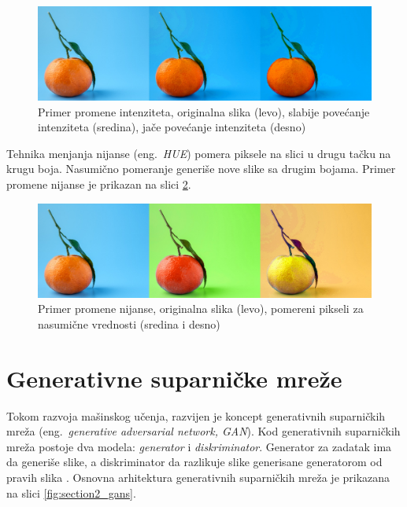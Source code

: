\documentclass[12pt,oneside]{memoir}
\begin{document}
\begin{figure}[ht]
    \centering
    \includegraphics[width=1\textwidth]{matfmaster/glava3/saturation.jpg}
    \caption{Primer promene intenziteta, originalna slika (levo), slabije povećanje intenziteta (sredina), jače povećanje intenziteta (desno) \cite{unsplashOrange}} 
    \label{fig:section3_saturation}
\end{figure}

Tehnika menjanja nijanse (eng.~\textit{HUE}) pomera piksele na slici u drugu tačku na krugu boja. Nasumično pomeranje generiše nove slike sa drugim bojama. Primer promene nijanse je prikazan na slici \ref{fig:section3_hue}.


\begin{figure}[ht]
    \centering
    \includegraphics[width=1\textwidth]{matfmaster/glava3/hue.jpg}
    \caption{Primer promene nijanse, originalna slika (levo), pomereni pikseli za nasumične vrednosti (sredina i desno) \cite{unsplashOrange}} 
    \label{fig:section3_hue}
\end{figure}

\section{Generativne suparničke mreže}
\label{section3_increasedata_gan}

Tokom razvoja mašinskog učenja, razvijen je koncept generativnih suparničkih mreža (eng.~\textit{generative adversarial network, GAN}). Kod generativnih suparničkih mreža postoje dva modela: \textit{generator} i \textit{diskriminator}. Generator za zadatak ima da generiše slike, a diskriminator da razlikuje slike generisane generatorom od pravih slika \cite{goodfellow2014generative}. %
Osnovna arhitektura generativnih suparničkih mreža je prikazana na slici \ref{fig:section2_gans}.
\end{document}

